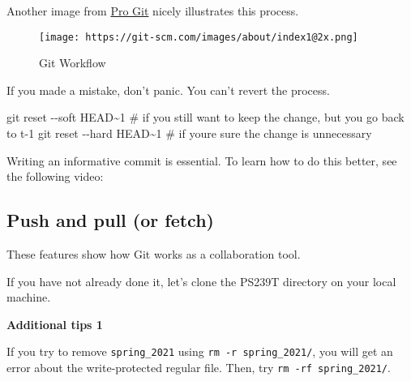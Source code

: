 \documentclass[
  letterpaper,
  DIV=11,
  numbers=noendperiod]{scrreprt}
\newenvironment{Shaded}{\begin{snugshade}}{\end{snugshade}}
\newcommand{\AttributeTok}[1]{\textcolor[rgb]{0.40,0.45,0.13}{#1}}
\newcommand{\CommentTok}[1]{\textcolor[rgb]{0.37,0.37,0.37}{#1}}
\newcommand{\ExtensionTok}[1]{\textcolor[rgb]{0.00,0.23,0.31}{#1}}
\newcommand{\FunctionTok}[1]{\textcolor[rgb]{0.28,0.35,0.67}{#1}}
\newcommand{\NormalTok}[1]{\textcolor[rgb]{0.00,0.23,0.31}{#1}}
\begin{document}
Another image from \href{https://git-scm.com/about/staging-area}{Pro
Git} nicely illustrates this process.

\begin{figure}

{\centering \texttt{[image: https://git-scm.com/images/about/index1@2x.png]}

}

\caption{Git Workflow}

\end{figure}

If you made a mistake, don't panic. You can't revert the process.

\begin{Shaded}
\begin{Highlighting}[]
\FunctionTok{git}\NormalTok{ reset }\AttributeTok{{-}{-}soft}\NormalTok{ HEAD\textasciitilde{}1 }\CommentTok{\# if you still want to keep the change, but you go back to t{-}1 }
\FunctionTok{git}\NormalTok{ reset }\AttributeTok{{-}{-}hard}\NormalTok{ HEAD\textasciitilde{}1 }\CommentTok{\# if you\textquotesingle{}re sure the change is unnecessary }
\end{Highlighting}
\end{Shaded}

Writing an informative commit is essential. To learn how to do this
better, see the following video:

\hypertarget{push-and-pull-or-fetch}{%
\subsection*{Push and pull (or fetch)}\label{push-and-pull-or-fetch}}

These features show how Git works as a collaboration tool.

If you have not already done it, let's clone the PS239T directory on
your local machine.

\begin{Shaded}
\end{Shaded}

\textbf{Additional tips 1}

If you try to remove \texttt{spring\_2021} using
\texttt{rm\ -r\ spring\_2021/}, you will get an error about the
write-protected regular file. Then, try \texttt{rm\ -rf\ spring\_2021/}.
\end{document}
